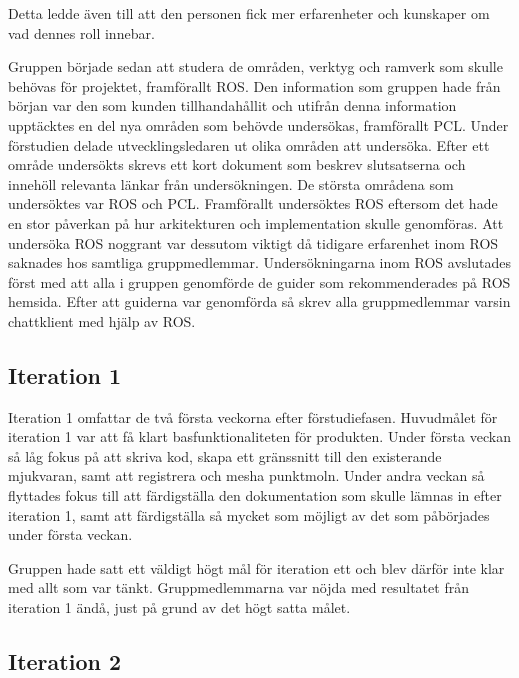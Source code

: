 Detta ledde även till att den personen fick mer erfarenheter och kunskaper om vad dennes roll innebar.

Gruppen började sedan att studera de områden, verktyg och ramverk som skulle behövas för projektet, framförallt ROS. Den information som gruppen hade från början var den som kunden tillhandahållit och utifrån denna information upptäcktes en del nya områden som behövde undersökas, framförallt PCL. Under förstudien delade utvecklingsledaren ut olika områden att undersöka. Efter ett område undersökts skrevs ett kort dokument som beskrev slutsatserna och innehöll relevanta länkar från undersökningen. De största områdena som undersöktes var ROS och PCL. Framförallt undersöktes ROS eftersom det hade en stor påverkan på hur arkitekturen och implementation skulle genomföras. Att undersöka ROS noggrant var dessutom viktigt då tidigare erfarenhet inom ROS saknades hos samtliga gruppmedlemmar. 
Undersökningarna inom ROS avslutades först med att alla i gruppen genomförde de guider som rekommenderades på ROS hemsida. Efter att guiderna var genomförda så skrev alla gruppmedlemmar varsin chattklient med hjälp av ROS.

\subsection{Iteration 1}

Iteration 1 omfattar de två första veckorna efter förstudiefasen. Huvudmålet för iteration 1 var att få klart basfunktionaliteten för produkten. Under första veckan så låg fokus på att skriva kod, skapa ett gränssnitt till den existerande mjukvaran, samt att registrera och mesha punktmoln. Under andra veckan så flyttades fokus till att färdigställa den dokumentation som skulle lämnas in efter iteration 1, samt att färdigställa så mycket som möjligt av det som påbörjades under första veckan.

Gruppen hade satt ett väldigt högt mål för iteration ett och blev därför inte klar med allt som var tänkt. Gruppmedlemmarna var nöjda med resultatet från iteration 1 ändå, just på grund av det högt satta målet.

\subsection{Iteration 2}

